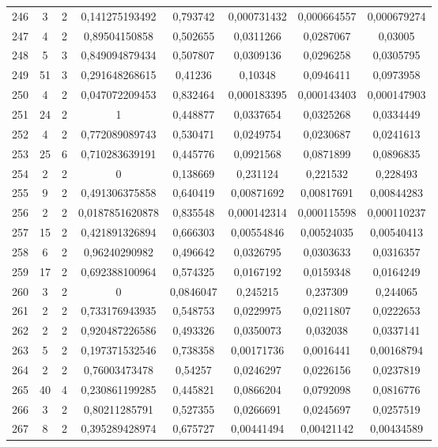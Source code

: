 \begin{longtable}{|c|c|c|c|c|c|c|c|}
246 & 3 & 2 & 0,141275193492 & 0,793742 & 0,000731432 & 0,000664557 & 0,000679274  \\
247 & 4 & 2 & 0,89504150858 & 0,502655 & 0,0311266 & 0,0287067 & 0,03005  \\
248 & 5 & 3 & 0,849094879434 & 0,507807 & 0,0309136 & 0,0296258 & 0,0305795  \\
249 & 51 & 3 & 0,291648268615 & 0,41236 & 0,10348 & 0,0946411 & 0,0973958  \\
250 & 4 & 2 & 0,047072209453 & 0,832464 & 0,000183395 & 0,000143403 & 0,000147903  \\
251 & 24 & 2 & 1 & 0,448877 & 0,0337654 & 0,0325268 & 0,0334449  \\
252 & 4 & 2 & 0,772089089743 & 0,530471 & 0,0249754 & 0,0230687 & 0,0241613  \\
253 & 25 & 6 & 0,710283639191 & 0,445776 & 0,0921568 & 0,0871899 & 0,0896835  \\
254 & 2 & 2 & 0 & 0,138669 & 0,231124 & 0,221532 & 0,228493  \\
255 & 9 & 2 & 0,491306375858 & 0,640419 & 0,00871692 & 0,00817691 & 0,00844283  \\
256 & 2 & 2 & 0,0187851620878 & 0,835548 & 0,000142314 & 0,000115598 & 0,000110237  \\
257 & 15 & 2 & 0,421891326894 & 0,666303 & 0,00554846 & 0,00524035 & 0,00540413  \\
258 & 6 & 2 & 0,96240290982 & 0,496642 & 0,0326795 & 0,0303633 & 0,0316357  \\
259 & 17 & 2 & 0,692388100964 & 0,574325 & 0,0167192 & 0,0159348 & 0,0164249  \\
260 & 3 & 2 & 0 & 0,0846047 & 0,245215 & 0,237309 & 0,244065  \\
261 & 2 & 2 & 0,733176943935 & 0,548753 & 0,0229975 & 0,0211807 & 0,0222653  \\
262 & 2 & 2 & 0,920487226586 & 0,493326 & 0,0350073 & 0,032038 & 0,0337141  \\
263 & 5 & 2 & 0,197371532546 & 0,738358 & 0,00171736 & 0,0016441 & 0,00168794  \\
264 & 2 & 2 & 0,76003473478 & 0,54257 & 0,0246297 & 0,0226156 & 0,0237819  \\
265 & 40 & 4 & 0,230861199285 & 0,445821 & 0,0866204 & 0,0792098 & 0,0816776  \\
266 & 3 & 2 & 0,80211285791 & 0,527355 & 0,0266691 & 0,0245697 & 0,0257519  \\
267 & 8 & 2 & 0,395289428974 & 0,675727 & 0,00441494 & 0,00421142 & 0,00434589  \\

\end{longtable}
